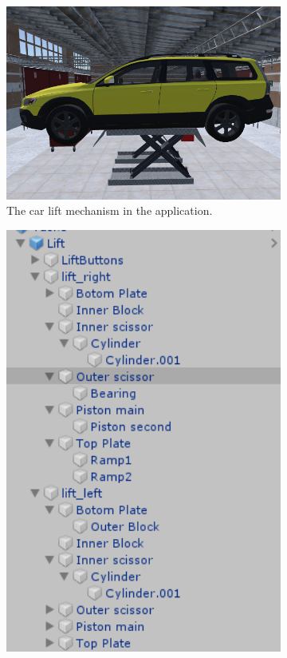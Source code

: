 \begin{figure}[H]
  \centering
  \begin{subfigure}[b]{0.61\textwidth}
    \includegraphics[width=1\textwidth]{fig/phase_2/implementation/carHoist.PNG}
 \caption{The car lift mechanism in the application.}
  \label{fig:carlift}
  \end{subfigure}
  \hfill%
  \begin{subfigure}[b]{0.28\textwidth}
    \includegraphics[width=1\textwidth]{fig/phase_2/implementation/carliftTreee.PNG}

\end{subfigure}
\end{figure}
